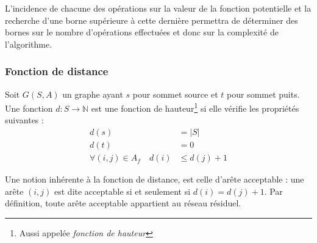 L'incidence de chacune des opérations sur la valeur de la fonction potentielle et la recherche d'une
borne supérieure à cette dernière permettra de déterminer des bornes sur le nombre d'opérations
effectuées et donc sur la complexité de l'algorithme.

\subsubsection{Fonction de distance}

Soit $G(S, A)$ un graphe ayant $s$ pour sommet source et $t$ pour sommet puits. Une fonction $d: S
\rightarrow \mathbb{N}$ est une fonction de hauteur\footnote{Aussi appelée \emph{fonction de
	hauteur}} si elle vérifie les propriétés suivantes :
\begin{subequations}
	\label{eq:prop_haut}
	\begin{align}
		d(s) &= |S| \label{eq:ph1} \\
		d(t) &= 0   \label{eq:ph2} \\
		\forall (i,j) \in A_f \quad d(i) &\leq d(j) + 1 \label{eq:ph3} 
	\end{align}
\end{subequations}

Une notion inhérente à la fonction de distance, est celle d'arête acceptable : une arête $(i,j)$ est
dite acceptable si et seulement si $d(i) = d(j) + 1$. Par définition, toute arête acceptable
appartient au réseau résiduel.

